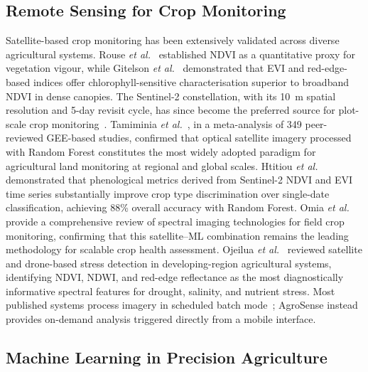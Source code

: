 \documentclass[conference]{IEEEtran}
\begin{document}
\subsection{Remote Sensing for Crop Monitoring}

Satellite-based crop monitoring has been extensively validated across diverse
agricultural systems. Rouse \textit{et al.}~\cite{rouse1974} established NDVI
as a quantitative proxy for vegetation vigour, while Gitelson \textit{et
al.}~\cite{gitelson2002} demonstrated that EVI and red-edge-based indices offer
chlorophyll-sensitive characterisation superior to broadband NDVI in dense
canopies. The Sentinel-2 constellation, with its 10~m spatial resolution and
5-day revisit cycle, has since become the preferred source for plot-scale crop
monitoring~\cite{immitzer2016}. Tamiminia \textit{et al.}~\cite{tamiminia2020},
in a meta-analysis of 349 peer-reviewed GEE-based studies, confirmed that
optical satellite imagery processed with Random Forest constitutes the most
widely adopted paradigm for agricultural land monitoring at regional and global
scales. Htitiou \textit{et al.}~\cite{htitiou2020} demonstrated that
phenological metrics derived from Sentinel-2 NDVI and EVI time series
substantially improve crop type discrimination over single-date classification,
achieving 88\% overall accuracy with Random Forest. Omia \textit{et
al.}~\cite{omia2023} provide a comprehensive review of spectral imaging
technologies for field crop monitoring, confirming that this satellite--ML
combination remains the leading methodology for scalable crop health assessment.
Ojeilua \textit{et al.}~\cite{ojeilua2025} reviewed satellite and drone-based
stress detection in developing-region agricultural systems, identifying NDVI,
NDWI, and red-edge reflectance as the most diagnostically informative spectral
features for drought, salinity, and nutrient stress. Most published systems
process imagery in scheduled batch mode~\cite{tamiminia2020,htitiou2020};
AgroSense instead provides on-demand analysis triggered directly from a mobile
interface.

\subsection{Machine Learning in Precision Agriculture}
\end{document}
